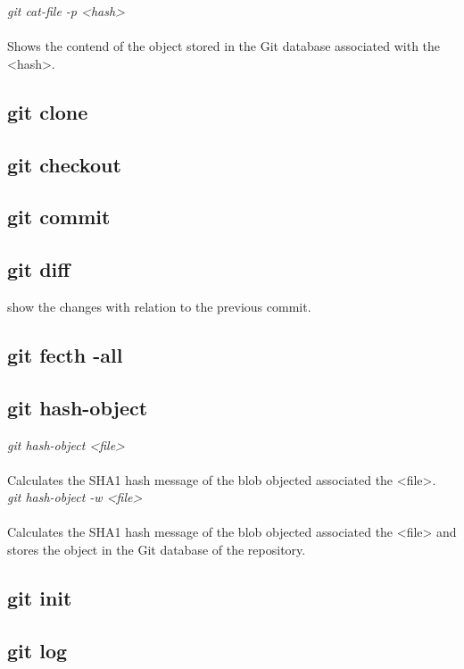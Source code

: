 \emph{git cat-file -p <hash>}\\
\\
Shows the contend of the object stored in the Git database associated with the <hash>.

\subsection{git clone}

\subsection{git checkout}

\subsection{git commit}

\subsection{git diff}

show the changes with relation to the previous commit.

\subsection{git fecth -all}

\subsection{git hash-object}

\hspace{\parindent}\emph{git hash-object <file>}\\
\\
Calculates the SHA1 hash message of the blob objected associated the <file>.\\

\emph{git hash-object -w <file>}\\
\\
Calculates the SHA1 hash message of the blob objected associated the <file> and stores the object in the Git database of the repository.

\subsection{git init}

\subsection{git log}

